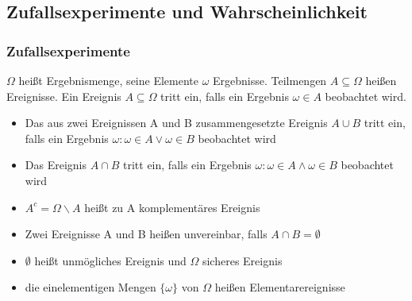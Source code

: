 \documentclass[
	ngerman,
	accentcolor=9c,%
	type=intern,
	marginpar=false
	]{tudapub}
\begin{document}
        \subsection{Zufallsexperimente und Wahrscheinlichkeit}
            \subsubsection{Zufallsexperimente}
                \begin{definition}
                    $\Omega$ heißt Ergebnismenge, seine Elemente $\omega$ Ergebnisse. Teilmengen $A \subseteq \Omega$ heißen Ereignisse.
                    Ein Ereignis $A \subseteq \Omega$ tritt ein, falls ein Ergebnis $\omega \in A$ beobachtet wird.
                \end{definition}
                \setcounter{satz}{2}
                \begin{definition}
                    \begin{itemize}
                        \item Das aus zwei Ereignissen A und B zusammengesetzte Ereignis $A\cup B$ tritt ein, falls ein Ergebnis
                        $\omega: \omega \in A \vee \omega \in B$ beobachtet wird
                        \item Das Ereignis $A \cap B$ tritt ein, falls ein Ergebnis
                        $\omega: \omega \in A \wedge \omega \in B$ beobachtet wird
                        \item $A^c = \Omega \backslash A$ heißt zu A komplementäres Ereignis
                        \item Zwei Ereignisse A und B heißen unvereinbar, falls $A\cap B = \emptyset$
                        \item $\emptyset$ heißt unmögliches Ereignis und $\Omega$ sicheres Ereignis
                        \item die einelementigen Mengen $\{\omega\}$ von $\Omega$ heißen Elementarereignisse
                    \end{itemize}
                \end{definition}
\end{document}
